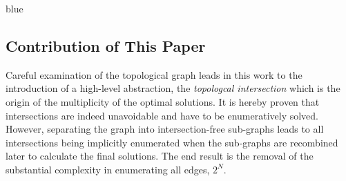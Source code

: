 \documentclass[journal]{IEEEtran}
\begin{document}

\begin{color}{blue}
\subsection{Contribution of This Paper}
\end{color}

Careful examination of the topological graph leads in this work to the introduction of a high-level abstraction, the \textit{topologcal intersection} which is the origin of the multiplicity of the optimal solutions. It is hereby proven that intersections are indeed unavoidable and have to be enumeratively solved. However, separating the graph into intersection-free sub-graphs leads to all intersections being implicitly enumerated when the sub-graphs are recombined later to calculate the final solutions. The end result is the removal of the substantial complexity in enumerating all edges, $2^N$. 
\end{document}

